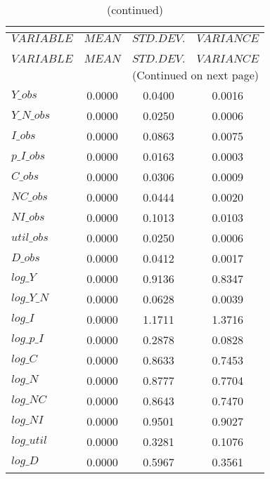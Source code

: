  
\begin{center}
\begin{longtable}{lccc} 
\caption{THEORETICAL MOMENTS}\\
 \label{Table:th_moments}\\
\toprule 
$VARIABLE   $	 & 	 $         MEAN$	 & 	 $    STD. DEV.$	 & 	 $     VARIANCE$\\
\midrule \endfirsthead 
\caption{(continued)}\\
 \toprule \\ 
$VARIABLE   $	 & 	 $         MEAN$	 & 	 $    STD. DEV.$	 & 	 $     VARIANCE$\\
\midrule \endhead 
\midrule \multicolumn{4}{r}{(Continued on next page)} \\ \bottomrule \endfoot 
\bottomrule \endlastfoot 
$Y\_obs     $	 & 	       0.0000	 & 	       0.0400	 & 	       0.0016 \\ 
$Y\_N\_obs  $	 & 	       0.0000	 & 	       0.0250	 & 	       0.0006 \\ 
$I\_obs     $	 & 	       0.0000	 & 	       0.0863	 & 	       0.0075 \\ 
$p\_I\_obs  $	 & 	       0.0000	 & 	       0.0163	 & 	       0.0003 \\ 
$C\_obs     $	 & 	       0.0000	 & 	       0.0306	 & 	       0.0009 \\ 
$NC\_obs    $	 & 	       0.0000	 & 	       0.0444	 & 	       0.0020 \\ 
$NI\_obs    $	 & 	       0.0000	 & 	       0.1013	 & 	       0.0103 \\ 
$util\_obs  $	 & 	       0.0000	 & 	       0.0250	 & 	       0.0006 \\ 
$D\_obs     $	 & 	       0.0000	 & 	       0.0412	 & 	       0.0017 \\ 
$log\_Y     $	 & 	       0.0000	 & 	       0.9136	 & 	       0.8347 \\ 
$log\_Y\_N  $	 & 	       0.0000	 & 	       0.0628	 & 	       0.0039 \\ 
$log\_I     $	 & 	       0.0000	 & 	       1.1711	 & 	       1.3716 \\ 
$log\_p\_I  $	 & 	       0.0000	 & 	       0.2878	 & 	       0.0828 \\ 
$log\_C     $	 & 	       0.0000	 & 	       0.8633	 & 	       0.7453 \\ 
$log\_N     $	 & 	       0.0000	 & 	       0.8777	 & 	       0.7704 \\ 
$log\_NC    $	 & 	       0.0000	 & 	       0.8643	 & 	       0.7470 \\ 
$log\_NI    $	 & 	       0.0000	 & 	       0.9501	 & 	       0.9027 \\ 
$log\_util  $	 & 	       0.0000	 & 	       0.3281	 & 	       0.1076 \\ 
$log\_D     $	 & 	       0.0000	 & 	       0.5967	 & 	       0.3561 \\ 
\end{longtable}
 \end{center}

